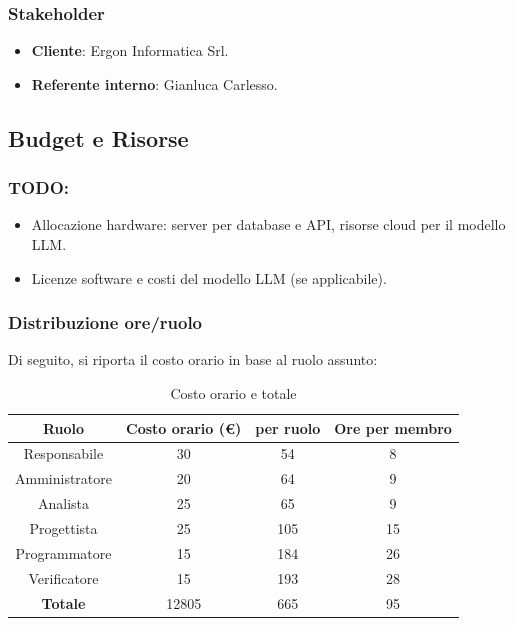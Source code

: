 \documentclass{article}
\begin{document}
        \subsubsection{Stakeholder}
        \begin{itemize}
            \item \textbf{Cliente}: Ergon Informatica Srl.
            \item \textbf{Referente interno}: Gianluca Carlesso.
        \end{itemize}

    \subsection{Budget e Risorse}
        \subsubsection{TODO: }
        \begin{itemize}
            \item Allocazione hardware: server per database e API, risorse cloud per il modello LLM.
            \item Licenze software e costi del modello LLM (se applicabile).
        \end{itemize}
        \subsubsection{Distribuzione ore/ruolo}
        Di seguito, si riporta il costo orario in base al ruolo assunto:
        \begin{table}[!h]
            \begin{center}
                \begin{tabular}{ |c|c|c|c| }
                    \hline
                    \textbf{Ruolo}          & \textbf{Costo orario} (\euro) &  \textbf{per ruolo}   & \textbf{Ore per membro} \\
                    \hline
                    Responsabile   & 30           &     54       &       8        \\
                    Amministratore & 20           &     64       &       9        \\
                    Analista       & 25           &     65       &       9       \\
                    Progettista    & 25           &     105      &       15       \\
                    Programmatore  & 15           &     184      &       26       \\
                    Verificatore   & 15           &     193      &       28       \\
                    \hline
                    \textbf{Totale}         &    12805    &     665       &       95       \\
                    \hline
                \end{tabular}
                \caption{Costo orario e totale}
            \end{center}
        \end{table}
\end{document}
